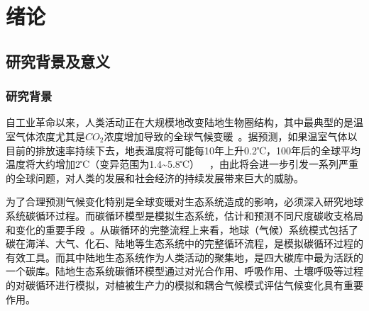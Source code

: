 \chapter{绪论}
\section{研究背景及意义}
\subsection{研究背景}

自工业革命以来，人类活动正在大规模地改变陆地生物圈结构，其中最典型的是温室气体浓度尤其是$CO_2$浓度增加导致的全球气候变暖~\cite{houghton2001climate}。据预测，如果温室气体以目前的排放速率持续下去，地表温度将可能每10年上升0.2℃，100年后的全球平均温度将大约增加2℃（变异范围为1.4\textasciitilde5.8℃）~\cite{Oliver2013Intergovernmental}~\cite{songyanyan}，由此将会进一步引发一系列严重的全球问题，对人类的发展和社会经济的持续发展带来巨大的威胁。

为了合理预测气候变化特别是全球变暖对生态系统造成的影响，必须深入研究地球系统碳循环过程。而碳循环模型是模拟生态系统，估计和预测不同尺度碳收支格局和变化的重要手段~\cite{cao2003interannual}。从碳循环的完整流程上来看，地球（气候）系统模式包括了碳在海洋、大气、化石、陆地等生态系统中的完整循环流程，是模拟碳循环过程的有效工具。而其中陆地生态系统作为人类活动的聚集地，是四大碳库中最为活跃的一个碳库。陆地生态系统碳循环模型通过对光合作用、呼吸作用、土壤呼吸等过程的对碳循环进行模拟，对植被生产力的模拟和耦合气候模式评估气候变化具有重要作用。


